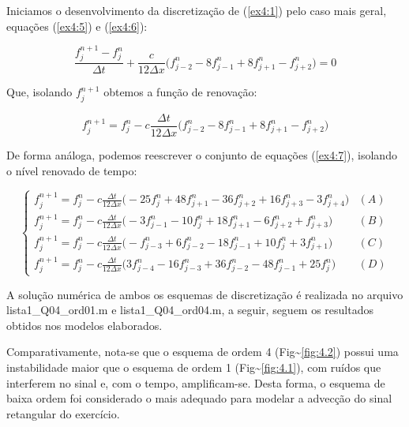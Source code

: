 \documentclass[11pt]{article}
\begin{document}
Iniciamos o desenvolvimento da discretização de (\ref{ex4:1}) pelo caso
mais geral, equações (\ref{ex4:5}) e (\ref{ex4:6}):

\begin{equation}
    \frac{f^{n+1}_{j} - f^{n}_{j}}{\Delta{t}} + \frac{c}{12\Delta{x}}\biggl( f^{n}_{j-2} - 8f^{n}_{j-1} + 8f^{n}_{j+1} - f^{n}_{j+2} \bigg) = 0
    \label{ex4:8}
\end{equation}

Que, isolando \(f^{n+1}_{j}\) obtemos a função de renovação:

\begin{equation}
    f^{n+1}_{j} = f^{n}_{j}-c\frac{\Delta{t}}{12\Delta{x}}\biggl( f^{n}_{j-2} - 8f^{n}_{j-1} + 8f^{n}_{j+1} - f^{n}_{j+2} \bigg)
    \label{ex4:9}
\end{equation}

De forma análoga, podemos reescrever o conjunto de equações
(\ref{ex4:7}), isolando o nível renovado de tempo:

\begin{equation}
    \begin{cases}
            f^{n+1}_{j} = f^{n}_{j}-c\frac{\Delta{t}}{12\Delta{x}}\biggl( - 25f^{n}_{j} + 48f^{n}_{j+1} - 36f^{n}_{j+2} + 16f^{n}_{j+3} - 3f^{n}_{j+4} \bigg) & (A) \\
            f^{n+1}_{j} = f^{n}_{j}-c\frac{\Delta{t}}{12\Delta{x}}\biggl( - 3f^{n}_{j-1} - 10f^{n}_{j} + 18f^{n}_{j+1} - 6f^{n}_{j+2} + f^{n}_{j+3}  \bigg) & (B) \\
            f^{n+1}_{j} = f^{n}_{j}-c\frac{\Delta{t}}{12\Delta{x}}\biggl( - f^{n}_{j-3} + 6f^{n}_{j-2} - 18f^{n}_{j-1} + 10f^{n}_{j} + 3f^{n}_{j+1} \bigg) & (C) \\
            f^{n+1}_{j} = f^{n}_{j}-c\frac{\Delta{t}}{12\Delta{x}}\biggl( 3f^{n}_{j-4} - 16f^{n}_{j-3} + 36f^{n}_{j-2} - 48f^{n}_{j-1} + 25f^{n}_{j} \bigg) & (D)
            \label{ex4:10}
    \end{cases}
\end{equation}

A solução numérica de ambos os esquemas de discretização é realizada no
arquivo lista1\_Q04\_ord01.m e lista1\_Q04\_ord04.m, a seguir, seguem os
resultados obtidos nos modelos elaborados.

Comparativamente, nota-se que o esquema de ordem 4
(Fig\textasciitilde{}\ref{fig:4.2}) possui uma instabilidade maior que o
esquema de ordem 1 (Fig\textasciitilde{}\ref{fig:4.1}), com ruídos que
interferem no sinal e, com o tempo, amplificam-se. Desta forma, o
esquema de baixa ordem foi considerado o mais adequado para modelar a
advecção do sinal retangular do exercício.
\end{document}
